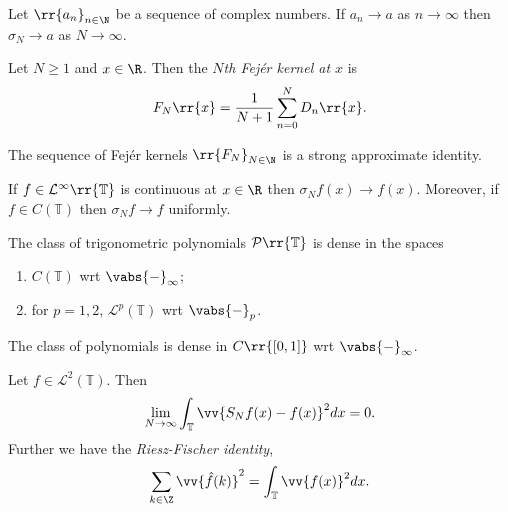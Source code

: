 \documentclass{article}
\begin{document}
\begin{proposition}
  Let $\rr{a_n}_{n\in\N}$ be a sequence of complex numbers. If $a_n\to a$ as $n\to\infty$
  then $\sigma_N\to a$ as $N\to \infty$.
\end{proposition}

\begin{definition}
  Let $N\geq 1$ and $x\in\R$. Then the \emph{$N$th Fej\'er kernel at $x$} is
  \begin{align*}
    F_N\rr{x}=\frac{1}{N+1}\sum_{n=0}^{N} D_n\rr{x}.
  \end{align*}
\end{definition}

\begin{proposition}
  The sequence of Fej\'er kernels $\rr{F_N}_{N\in\N}$ is a strong approximate identity.
\end{proposition}

\begin{corollary}
  If $f\in\mathcal L^\infty\rr{\mathbb T}$ is continuous at $x\in\R$ then
  $\sigma_N f(x)\to f(x)$. Moreover, if $f\in C(\mathbb T)$ then $\sigma_Nf\to f$
  uniformly.
\end{corollary}

\begin{corollary}
  The class of trigonometric polynomials $\mathcal P\rr{\mathbb T}$ is dense in the spaces
  \begin{enumerate}
    \item $C(\mathbb T)$ wrt $\vabs{-}_{\infty}$;
    \item for $p=1,2$, $\mathcal L^p(\mathbb T)$ wrt $\vabs{-}_{p}$.
  \end{enumerate}
\end{corollary}

\begin{corollary}
  The class of polynomials is dense in $C\rr{[0,1]}$ wrt $\vabs{-}_{\infty}$.
\end{corollary}

\begin{theorem}
  Let $f\in\mathcal L^2(\mathbb T)$. Then
  \begin{align*}
    \lim_{N\to\infty}\int_{\mathbb T}\vv{S_N f(x)-f(x)}^2 dx = 0.
  \end{align*}
  Further we have the \emph{Riesz-Fischer identity},
  \begin{align*}
    \sum_{k\in\Z} \vv{\hat f(k)}^2 = \int_{\mathbb T} \vv{f(x)}^2dx.
  \end{align*}
\end{theorem}
\end{document}
